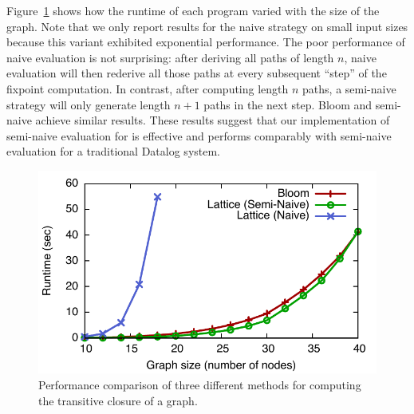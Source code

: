 Figure~\ref{fig:tc-perf-graph} shows how the runtime of each program varied with
the size of the graph. Note that we only report results for the naive \lang
strategy on small input sizes because this variant exhibited exponential
performance. The poor performance of naive evaluation is not surprising: after
deriving all paths of length $n$, naive evaluation will then rederive all those
paths at every subsequent ``step'' of the fixpoint computation. In contrast,
after computing length $n$ paths, a semi-naive strategy will only generate
length $n+1$ paths in the next step. Bloom and semi-naive \lang achieve similar
results. These results suggest that our implementation of semi-naive evaluation
for \lang is effective and performs comparably with semi-naive evaluation for a
traditional Datalog system.

\begin{figure}
\includegraphics[width=\linewidth]{fig/sn_perf}
\caption{Performance comparison of three different methods for computing the
  transitive closure of a graph.}
\label{fig:tc-perf-graph}
\end{figure}